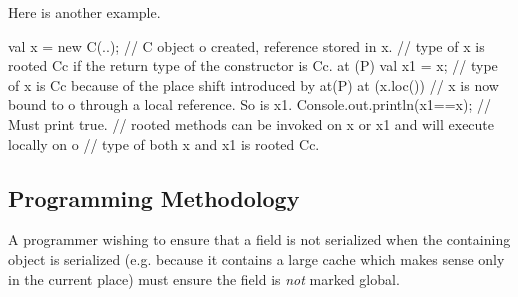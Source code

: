 Here is another example.
 \begin{x10}
val x = new C(..); 
// C object o created, reference stored in x. 
// type of x is rooted C{c} if the return type of the constructor is C{c}. 
at (P) { 
    val x1 = x; // type of x is C{c} because of the place shift introduced by at(P)
  at (x.loc()) {
        // x is now bound to o through a local reference. So is x1.
    Console.out.println(x1==x); // Must print true.
      // rooted methods can be invoked on x or x1 and will execute locally on o
      // type of both x and x1 is rooted C{c}.
  }
}
\end{x10}
 


  
\subsection{Programming Methodology}


A programmer wishing to ensure that a  field is not serialized when
the containing object is serialized (e.g. because it contains a large
cache which makes sense only in the current place) must ensure the
field is \emph{not} marked global.


